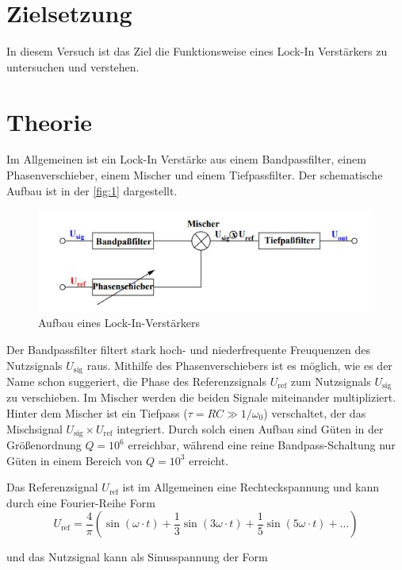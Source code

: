 \section*{Zielsetzung}
In diesem Versuch ist das Ziel die Funktionsweise eines Lock-In Verstärkers zu untersuchen und verstehen.

\section{Theorie}
Im Allgemeinen ist ein Lock-In Verstärke aus einem Bandpassfilter, einem Phasenverschieber, einem Mischer und einem Tiefpassfilter. Der schematische 
Aufbau ist in der \autoref{fig:1} dargestellt.

\begin{figure}[H]
    \centering
    \includegraphics{Picture/0.jpg}
    \caption{Aufbau eines Lock-In-Verstärkers %
    }
    \label{fig:1}
\end{figure}

\noindent
Der Bandpassfilter filtert stark hoch- und niederfrequente Freuquenzen des Nutzsignals $U_\text{sig}$ raus. Mithilfe des Phasenverschiebers ist es möglich, wie es der Name schon suggeriert, die Phase des Referenzsignals $U_\text{ref}$ zum Nutzsignals $U_\text{sig}$ zu verschieben. Im Mischer werden die beiden Signale miteinander multipliziert. Hinter dem Mischer ist ein Tiefpass ($\tau = RC ≫ 1/\omega_0$) verschaltet,  der das Mischsignal  $U_\text{sig} \times U_\text{ref}$ integriert. Durch solch einen Aufbau sind Güten in der Größenordnung $Q=10^6$ erreichbar, während eine reine Bandpass-Schaltung nur Güten in einem Bereich von $Q=10^3$ erreicht. \par
Das Referenzsignal $U_\text{ref}$ ist im Allgemeinen eine Rechteckspannung und kann durch eine Fourier-Reihe Form 
\begin{equation}
    U_\text{ref} = \frac{4}{\pi}(\sin(\omega \cdot t) + \frac{1}{3}\sin(3\omega \cdot t) +  \frac{1}{5}\sin(5\omega \cdot t) + ...)
    \label{eqn:uref}
\end{equation}

\noindent
und das Nutzsignal kann als Sinusspannung der Form 

